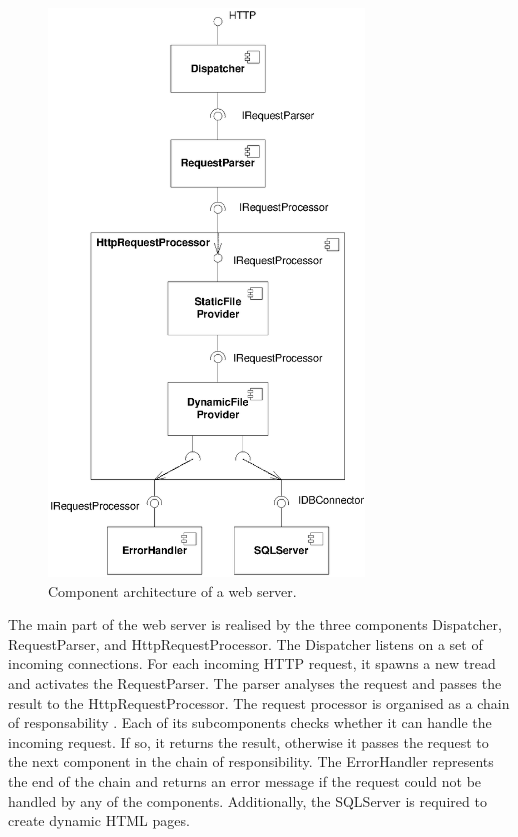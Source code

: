 \begin{figure}[htbp]
\centering
\includegraphics[width=3.3in]{example/WebserverComponents}
\caption{Component architecture of a web server.}
\label{fig:WebserverComponents}
\end{figure}

The main part of the web server is realised by the three components Dispatcher,
RequestParser, and HttpRequestProcessor. The Dispatcher listens on a set of
incoming connections. For each incoming HTTP request, it spawns a new tread and
activates the RequestParser. The parser analyses the request and passes the
result to the HttpRequestProcessor. The request processor is organised as a
chain of responsability \cite{gamma1995a}. Each of its subcomponents checks
whether it can handle the incoming request. If so, it returns the result,
otherwise it passes the request to the next component in the chain of
responsibility. The ErrorHandler represents the end of the chain and returns an
error message if the request could not be handled by any of the components.
Additionally, the SQLServer is required to create dynamic HTML pages.


